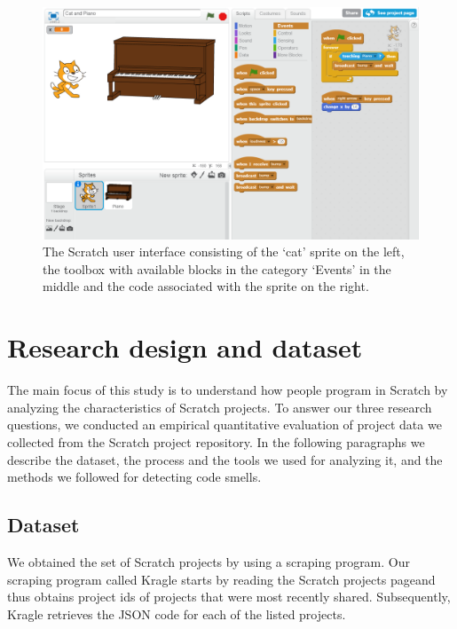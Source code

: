 \documentclass{sig-alternate}
\begin{document}
\begin{figure}
	\begin{center}
		\includegraphics[width=\columnwidth]{fig/ui.png}
		\vspace{-1em}
		\caption{The Scratch user interface consisting of the `cat' sprite on the left, the toolbox with available blocks in the category `Events' in the middle and the code associated with the sprite on the right.}
		\label{fig:ui}
	\end{center}
\end{figure} 

\section{Research design and dataset}
\label{researchDesign}

The main focus of this study is to understand how people program in Scratch by analyzing the characteristics of Scratch projects. To answer our three research questions, we conducted an empirical quantitative evaluation of project data we collected from the Scratch project repository. In the following paragraphs we describe the dataset, the process and the tools we used for analyzing it, and the methods we followed for detecting code smells.

\subsection{Dataset}
\label{dataset}

We obtained the set of Scratch projects by using a scraping program. Our scraping program called Kragle starts by reading the Scratch projects page\footnotemark[\ref{scratchpublic}] and thus obtains project ids of projects that were most recently shared. Subsequently, Kragle retrieves the JSON code for each of the listed projects. 
\end{document}
